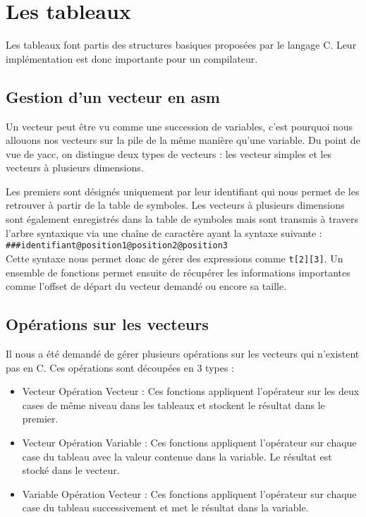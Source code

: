 \vspace{0.5cm}
\section{Les tableaux}

\vspace{0.5cm}
Les tableaux font partis des structures basiques proposées par le langage C. Leur implémentation est donc importante pour un compilateur. 

\subsection{Gestion d'un vecteur en asm}

Un vecteur peut être vu comme une succession de variables, c'est pourquoi nous allouons nos vecteurs sur la pile de la même manière qu'une variable. Du point de vue de yacc, on distingue deux types de vecteurs : les vecteur simples et les vecteurs à plusieurs dimensions. 

\vspace{0.5cm}
Les premiers sont désignés uniquement par leur identifiant qui nous permet de les retrouver à partir de la table de symboles. Les vecteurs à plusieurs dimensions sont également enregistrés dans la table de symboles mais sont transmis à travers l'arbre syntaxique via une chaîne de caractère ayant la syntaxe suivante : \\
\verb?###identifiant@position1@position2@position3? \\
Cette syntaxe nous permet donc de gérer des expressions comme \verb?t[2][3]?. Un ensemble de fonctions permet ensuite de récupérer les informations importantes comme l'offset de départ du vecteur demandé ou encore sa taille.

\subsection{Opérations sur les vecteurs}

Il nous a été demandé de gérer plusieurs opérations sur les vecteurs qui n'existent pas en C. Ces opérations sont découpées en 3 types :
\begin{itemize}
\item Vecteur Opération Vecteur : Ces fonctions appliquent l'opérateur sur les deux cases de m\^eme niveau dans les tableaux et stockent le résultat dans le premier.
\item Vecteur Opération Variable : Ces fonctions appliquent l'opérateur sur chaque case du tableau avec la valeur contenue dans la variable. Le résultat est stocké dans le vecteur.
\item Variable Opération Vecteur : Ces fonctions appliquent l'opérateur sur chaque case du tableau successivement et met le résultat dans la variable.
\end{itemize}

